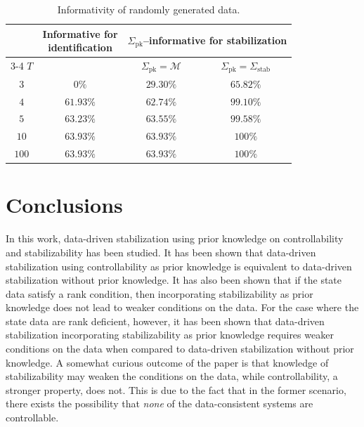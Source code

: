 \documentclass[9pt,shortpaper,twoside,web]{ieeecolor}
\begin{document}
\begin{table}[t]
\centering
\caption{Informativity of randomly generated data.}
\label{tab:MC_Analysis}
\begin{tabular}{cccc}
\toprule
& \multirow{2}{*}{\parbox{3cm}{\centering \vspace{1mm} Informative for\\identification \cite[Def. 5]{van2020data}}} &  \multicolumn{2}{c}{$\Sigma_\text{pk}$--informative for stabilization} \\
\cmidrule(l){3-4}
$T$  &  & $\Sigma_\text{pk}=\mathcal{M}$ & $\Sigma_\text{pk}=\Sigma_\text{stab}$ \\
\midrule
$3$ & $0 \% $ & $29.30 \% $ & $65.82 \% $ \\
$4$ & $61.93 \% $ & $62.74 \% $ & $99.10 \% $ \\
$5$ & $63.23 \% $ & $63.55 \% $ & $99.58 \% $ \\
$10$ & $63.93 \% $ & $63.93 \% $ & $100 \% $ \\
$100$ & $63.93 \% $ & $63.93 \% $ & $100 \% $ \\
\bottomrule
\end{tabular}\vspace{-0.3 cm}
\end{table}

\section{Conclusions}

In this work, data-driven stabilization using prior knowledge on controllability and stabilizability has been studied. It has been shown that data-driven stabilization using controllability as prior knowledge is equivalent to data-driven stabilization without prior knowledge. It has also been shown that if the state data satisfy a rank condition, then incorporating stabilizability as prior knowledge does not lead to weaker conditions on the data. For the case where the state data are rank deficient, however, it has been shown that data-driven stabilization incorporating stabilizability as prior knowledge requires weaker conditions on the data when compared to data-driven stabilization without prior knowledge. A somewhat curious outcome of the paper is that knowledge of stabilizability may weaken the conditions on the data, while controllability, a stronger property, does not. This is due to the fact that in the former scenario, there exists the possibility that \emph{none} of the data-consistent systems are controllable.%
\end{document}
